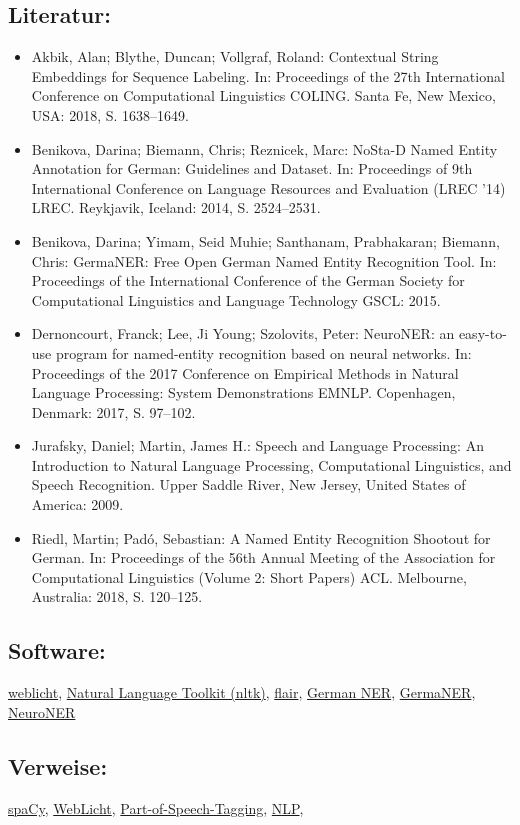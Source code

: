 \documentclass{article}
\begin{document}
        \subsection*{Literatur:}\begin{itemize}\item Akbik, Alan; Blythe, Duncan; Vollgraf, Roland: Contextual String Embeddings for Sequence Labeling. In: Proceedings of the 27th International Conference on Computational Linguistics COLING. Santa Fe, New Mexico, USA: 2018, S. 1638–1649.\item Benikova, Darina; Biemann, Chris; Reznicek, Marc: NoSta-D Named Entity Annotation for German: Guidelines and Dataset. In: Proceedings of 9th International Conference on Language Resources and Evaluation (LREC '14) LREC. Reykjavik, Iceland: 2014, S. 2524–2531.\item Benikova, Darina; Yimam, Seid Muhie; Santhanam, Prabhakaran; Biemann, Chris: GermaNER: Free Open German Named Entity Recognition Tool. In: Proceedings of the International Conference of the German Society for Computational Linguistics and Language Technology GSCL: 2015.\item Dernoncourt, Franck; Lee, Ji Young; Szolovits, Peter: NeuroNER: an easy-to-use program for named-entity recognition based on neural networks. In: Proceedings of the 2017 Conference on Empirical Methods in Natural Language Processing: System Demonstrations EMNLP. Copenhagen, Denmark: 2017, S. 97–102.\item Jurafsky, Daniel; Martin, James H.: Speech and Language Processing: An Introduction to Natural Language Processing, Computational Linguistics, and Speech Recognition. Upper Saddle River, New Jersey, United States of America: 2009.\item Riedl, Martin; Padó, Sebastian: A Named Entity Recognition Shootout for German. In: Proceedings of the 56th Annual Meeting of the Association for Computational Linguistics (Volume 2: Short Papers) ACL. Melbourne, Australia: 2018, S. 120–125.\end{itemize}\subsection*{Software:}\href{https://weblicht.sfs.uni-tuebingen.de/weblicht/}{weblicht}, \href{https://www.nltk.org/}{Natural Language Toolkit (nltk)}, \href{https://github.com/zalandoresearch/flair}{flair}, \href{https://www.ims.uni-stuttgart.de/forschung/ressourcen/werkzeuge/german-ner/}{German NER}, \href{https://github.com/tudarmstadt-lt/GermaNER}{GermaNER}, \href{http://neuroner.com/}{NeuroNER}\subsection*{Verweise:}\href{https://gams.uni-graz.at/o:konde.170}{spaCy}, \href{https://gams.uni-graz.at/o:konde.212}{WebLicht}, \href{https://gams.uni-graz.at/o:konde.156}{Part-of-Speech-Tagging}, \href{https://gams.uni-graz.at/o:konde.145}{NLP}, 
\end{document}
